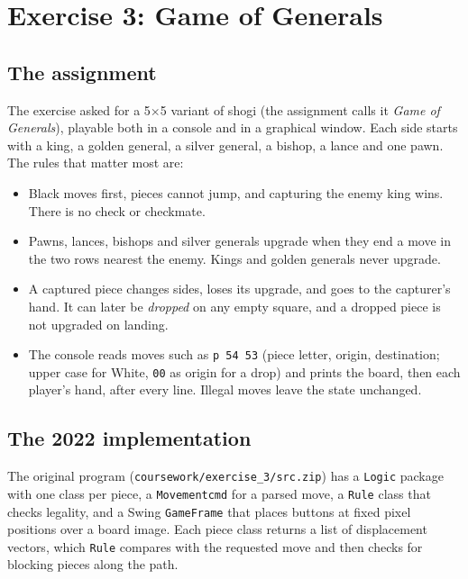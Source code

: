 \documentclass[11pt,a4paper]{article}
\begin{document}
\section{Exercise 3: Game of Generals}

\subsection{The assignment}

The exercise asked for a 5$\times$5 variant of shogi (the assignment calls it \emph{Game of Generals}), playable both in a console and in a graphical window. Each side starts with a king, a golden general, a silver general, a bishop, a lance and one pawn. The rules that matter most are:

\begin{itemize}
\item Black moves first, pieces cannot jump, and capturing the enemy king wins. There is no check or checkmate.
\item Pawns, lances, bishops and silver generals upgrade when they end a move in the two rows nearest the enemy. Kings and golden generals never upgrade.
\item A captured piece changes sides, loses its upgrade, and goes to the capturer's hand. It can later be \emph{dropped} on any empty square, and a dropped piece is not upgraded on landing.
\item The console reads moves such as \texttt{p 54 53} (piece letter, origin, destination; upper case for White, \texttt{00} as origin for a drop) and prints the board, then each player's hand, after every line. Illegal moves leave the state unchanged.
\end{itemize}

\subsection{The 2022 implementation}

The original program (\texttt{coursework/exercise\_3/src.zip}) has a \texttt{Logic} package with one class per piece, a \texttt{Movementcmd} for a parsed move, a \texttt{Rule} class that checks legality, and a Swing \texttt{GameFrame} that places buttons at fixed pixel positions over a board image. Each piece class returns a list of displacement vectors, which \texttt{Rule} compares with the requested move and then checks for blocking pieces along the path.
\end{document}
